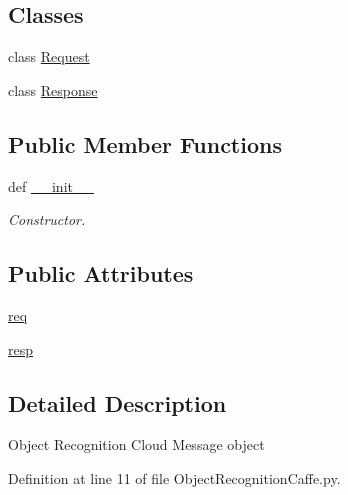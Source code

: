\subsection*{Classes}
\begin{DoxyCompactItemize}
\item 
class \hyperlink{classRappCloud_1_1CloudMsgs_1_1ObjectRecognitionCaffe_1_1ObjectRecognitionCaffe_1_1Request}{Request}
\item 
class \hyperlink{classRappCloud_1_1CloudMsgs_1_1ObjectRecognitionCaffe_1_1ObjectRecognitionCaffe_1_1Response}{Response}
\end{DoxyCompactItemize}
\subsection*{Public Member Functions}
\begin{DoxyCompactItemize}
\item 
def \hyperlink{classRappCloud_1_1CloudMsgs_1_1ObjectRecognitionCaffe_1_1ObjectRecognitionCaffe_a878db2feae0423b5903690dd894e1f86}{\-\_\-\-\_\-init\-\_\-\-\_\-}
\begin{DoxyCompactList}\small\item\em Constructor. \end{DoxyCompactList}\end{DoxyCompactItemize}
\subsection*{Public Attributes}
\begin{DoxyCompactItemize}
\item 
\hyperlink{classRappCloud_1_1CloudMsgs_1_1ObjectRecognitionCaffe_1_1ObjectRecognitionCaffe_a5298d34c830c9944a766683985b9d36a}{req}
\item 
\hyperlink{classRappCloud_1_1CloudMsgs_1_1ObjectRecognitionCaffe_1_1ObjectRecognitionCaffe_a475791974e5352ed431c0cb2f88585e2}{resp}
\end{DoxyCompactItemize}


\subsection{Detailed Description}
\begin{DoxyVerb}Object Recognition Cloud Message object\end{DoxyVerb}
 

Definition at line 11 of file Object\-Recognition\-Caffe.\-py.



